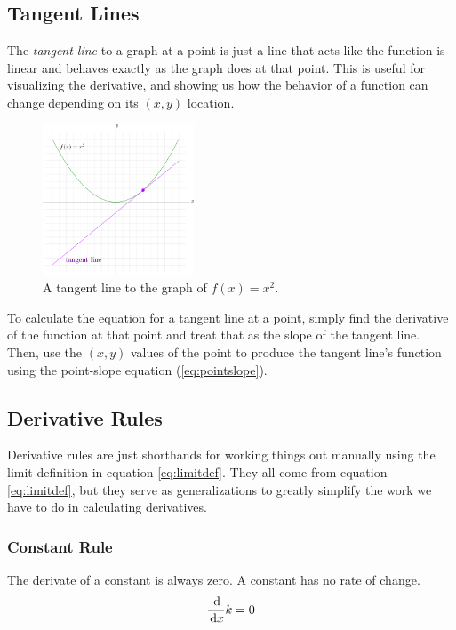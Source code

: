 \subsection{Tangent Lines}

The \emph{tangent line} to a graph at a point is just a line that acts like the function is linear and behaves exactly as the graph does at that point. This is useful for visualizing the derivative, and showing us how the behavior of a function can change depending on its $(x,y)$ location.

\begin{figure}[H]
  \begin{center}
    \includegraphics[width=0.4\textwidth]{continuous/derivatives/tangent.eps}
  \end{center}
  \caption{A tangent line to the graph of $f(x)=x^2$.}
\end{figure}

To calculate the equation for a tangent line at a point, simply find the
derivative of the function at that point and treat that as the slope of the
tangent line. Then, use the $(x, y)$ values of the point to produce the tangent line's function
using the point-slope equation (\eqref{eq:pointslope}).
\subsection{Derivative Rules}

Derivative rules are just shorthands for working things out manually using the
limit definition in equation \eqref{eq:limitdef}. They all come from equation \eqref{eq:limitdef}, but they serve as generalizations to greatly simplify the work we have to do in calculating derivatives.

\subsubsection{Constant Rule}

The derivate of a constant is always zero. A constant has no rate of change.
\[\frac{\,\mathrm{d}}{\,\mathrm{d} x} k=0\]

